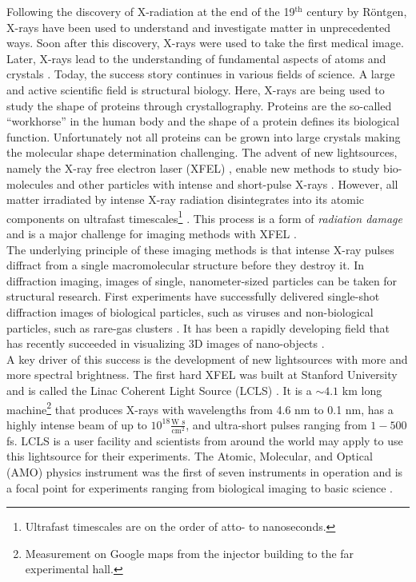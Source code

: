 Following the discovery of X-radiation at the end of the 19$^{\text{th}}$ century by R\"ontgen, X-rays have been used to understand and investigate matter in unprecedented ways. Soon after this discovery, X-rays were used to take the first medical image. Later, X-rays lead to the understanding of fundamental aspects of atoms \citep{Siegbahn-NP} and crystals \citep{Laue-NP,Bragg-NP}. Today, the success story continues in various fields of science. A large and active scientific field is structural biology. Here, X-rays are being used to study the shape of proteins through crystallography. Proteins are the so-called ``workhorse'' in the human body and the shape of a protein defines its biological function. Unfortunately not all proteins can be grown into large crystals making the molecular shape determination challenging. The advent of new lightsources, namely the X-ray free electron laser (XFEL) \citep{Ackermann-2007-NPho}, enable new methods to study bio-molecules and other particles with intense and short-pulse X-rays \citep{Chapman-2006-NatPhys,Chapman-2011-Nature}. However, all matter irradiated by intense X-ray radiation disintegrates into its atomic components on ultrafast timescales\footnote{Ultrafast timescales are on the order of atto- to nanoseconds.} \citep{Neutze-2000-Nature}. This process is a form of \textit{radiation damage} and is a major challenge for imaging methods with XFEL \citep{Aquila-2015-StrucDyn}.\\[1\baselineskip]
%
The underlying principle of these imaging methods is that intense X-ray pulses diffract from a single macromolecular structure before they destroy it. In diffraction imaging, images of single, nanometer-sized particles can be taken for structural research. First experiments have successfully delivered single-shot diffraction images of biological particles, such as viruses \citep{Seibert-2011-Nature} and non-biological particles, such as rare-gas clusters \citep{Gomez-2014-Science}. It has been a rapidly developing field that has recently succeeded in visualizing 3D images of nano-objects \citep{Ekeberg-2015-PRL,Barke-2015-NatComm}.\\[1\baselineskip]
%
A key driver of this success is the development of new lightsources with more and more spectral brightness. The first hard XFEL was built at Stanford University and is called the Linac Coherent Light Source (LCLS) \citep{Emma-2010-NatPho}. It is a $\sim 4.1$ km long machine\footnote{Measurement on Google maps from the injector building to the far experimental hall.} that produces X-rays with wavelengths from 4.6 nm to 0.1 nm, has a highly intense beam of up to $10^{18} \tfrac{\text{W s}}{\text{cm}^{2}}$, and ultra-short pulses ranging from $1-500$ fs. LCLS is a user facility and scientists from around the world may apply to use this lightsource for their experiments. The Atomic, Molecular, and Optical (AMO) physics instrument was the first of seven instruments in operation and is a focal point for experiments ranging from biological imaging to basic science \citep{Bostedt-2016-RMP}.\\[1\baselineskip]
